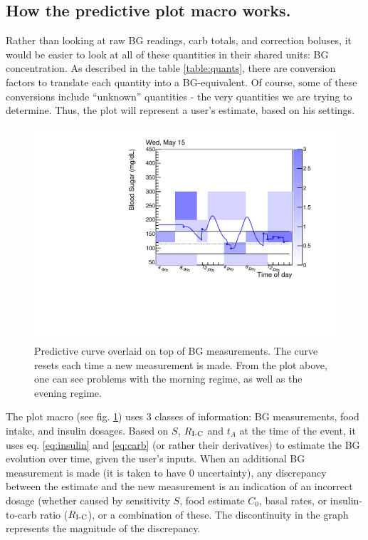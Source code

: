 \subsection{How the predictive plot macro works.} 

Rather than looking at raw BG readings, carb totals, and correction boluses, it would be easier to 
look at all of these quantities in their shared units: BG concentration. As described in the table 
\ref{table:quants}, there are conversion factors to translate each quantity into a BG-equivalent. 
Of course, some of these conversions include ``unknown'' quantities - the very quantities we are 
trying to determine. Thus, the plot will represent a user's estimate, based on his settings.

\begin{figure}[htbp]
\begin{center}
\includegraphics[width=4.5in]{figures/example_predictive.pdf}
\caption{Predictive curve overlaid on top of BG measurements. The curve resets each time a new 
measurement is made. From the plot above, one can see problems with the morning regime, as well as 
the evening regime. 
}
\label{fig:predictive}
\end{center}
\end{figure}

The plot macro (see fig. \ref{fig:predictive}) uses 3 classes of information: BG measurements, food 
intake, and insulin dosages. Based on $S$, $R_\text{I-C}$ and $t_A$ at the time of the event, it uses 
eq. \ref{eq:insulin} and \ref{eq:carb} (or rather their derivatives) to estimate the BG evolution 
over time, given the user's inputs. When an additional BG measurement is made (it is taken to have 0 
uncertainty), any discrepancy between the estimate and the new measurement is an indication of an 
incorrect dosage (whether caused by sensitivity $S$, food estimate $C_0$, basal rates, or 
insulin-to-carb ratio ($R_\text{I-C}$), or a combination of these. The discontinuity in the graph represents 
the magnitude of the discrepancy.

